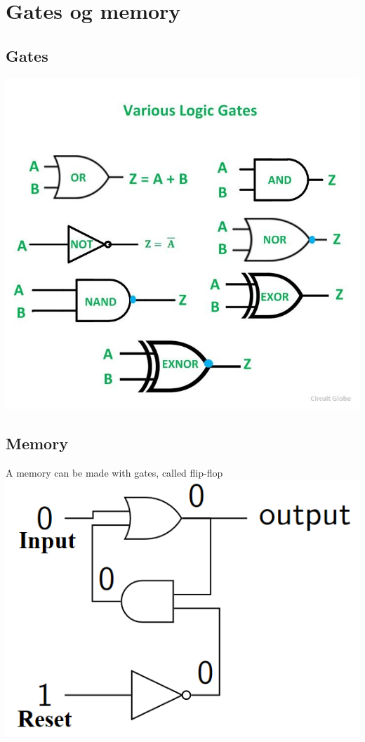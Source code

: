 \documentclass[12pt, a4paper]{article}
\begin{document}
		\section{Gates og memory}
			\subsection{Gates}
				\includegraphics[width=\linewidth]{assets/gates.jpg}
			\subsection{Memory}
				A memory can be made with gates, called flip-flop\\
				\includegraphics[width=\linewidth]{assets/memory.png}
\end{document}
